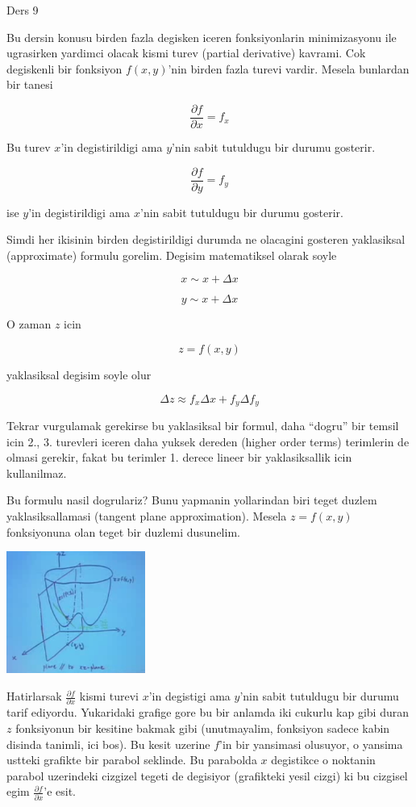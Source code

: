\documentclass[12pt,fleqn]{article}
\begin{document}
Ders 9

Bu dersin konusu birden fazla degisken iceren fonksiyonlarin minimizasyonu
ile ugrasirken yardimci olacak kismi turev (partial derivative)
kavrami. Cok degiskenli bir fonksiyon $f(x,y)$'nin birden fazla turevi
vardir. Mesela bunlardan bir tanesi

\[ \frac{\partial f}{\partial x} = f_x \]

Bu turev $x$'in degistirildigi ama $y$'nin sabit tutuldugu bir durumu
gosterir. 

\[ \frac{\partial f}{\partial y} = f_y \]

ise $y$'in degistirildigi ama $x$'nin sabit tutuldugu bir durumu gosterir.

Simdi her ikisinin birden degistirildigi durumda ne olacagini gosteren
yaklasiksal (approximate) formulu gorelim. Degisim matematiksel olarak
soyle

\[ x \sim x + \Delta x \]

\[ y \sim x + \Delta x \]

O zaman $z$ icin

\[ z = f(x,y) \]

yaklasiksal degisim soyle olur

\begin{equation}\label{eq1}
\Delta z \approx f_x\Delta x + f_y \Delta f_y
\end{equation}


Tekrar vurgulamak gerekirse bu yaklasiksal bir formul, daha ``dogru'' bir
temsil icin 2., 3. turevleri iceren daha yuksek dereden (higher order
terms) terimlerin de olmasi gerekir, fakat bu terimler 1. derece lineer bir
yaklasiksallik icin kullanilmaz. 

Bu formulu nasil dogrulariz? Bunu yapmanin yollarindan biri teget duzlem
yaklasiksallamasi (tangent plane approximation). Mesela $z = f(x,y)$
fonksiyonuna olan teget bir duzlemi dusunelim.

\includegraphics[height=4cm]{9_1.png}

Hatirlarsak $\frac{\partial f}{\partial x}$ kismi turevi $x$'in degistigi
ama $y$'nin sabit tutuldugu bir durumu tarif ediyordu. Yukaridaki grafige
gore bu bir anlamda iki cukurlu kap gibi duran $z$ fonksiyonun bir kesitine
bakmak gibi (unutmayalim, fonksiyon sadece kabin disinda tanimli, ici
bos). Bu kesit uzerine $f$'in bir yansimasi olusuyor, o yansima ustteki
grafikte bir parabol seklinde. Bu parabolda $x$ degistikce o noktanin
parabol uzerindeki cizgizel tegeti de degisiyor (grafikteki yesil cizgi) ki
bu cizgisel egim $\frac{\partial f}{\partial x}$'e esit.
\end{document}
